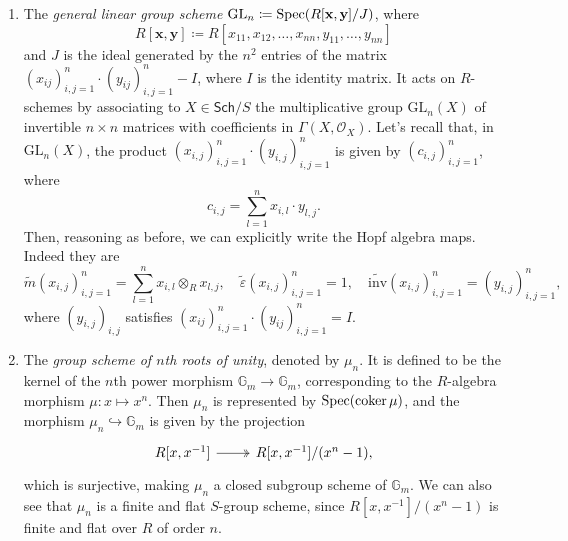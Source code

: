\begin{ex}
\begin{enumerate}
		\item The \emph{general linear group scheme} $\mathrm{GL}_n \coloneqq 
			\operatorname{Spec}(R[\mathbf{x},\mathbf{y}]/J)$,
			where
			\begin{equation*}
				R[\mathbf{x},\mathbf{y}] \coloneqq
				R[x_{11}, x_{12}, \ldots, x_{nn},
				y_{11}, \ldots, y_{nn}]
			\end{equation*} 
			and $J$ is the ideal generated by the $n^2$ entries of the matrix
			$\left( x_{ij} \right)_{i,j=1}^n \cdot \left( y_{ij} \right)_{i,j=1}^n - I$,
			where $I$ is the identity matrix.
			It acts on $R$-schemes by associating to
			$X \in \mathsf{Sch}/S$ the multiplicative group
			$\mathrm{GL}_n(X)$ of invertible $n \times n$
			matrices with coefficients in $\Gamma \left( X , \mathcal{O}_{ X } \right)$.
			Let's recall that, in $\mathrm{GL}_n(X)$, the product
			$\left( x_{i,j} \right)_{i,j = 1}^n \cdot 
			\left( y_{i,j} \right)_{i,j = 1}^n$
			is given by $\left( c_{i,j} \right)_{i,j = 1}^n$, where
			\begin{equation*}
			c_{i,j} = \sum_{l=1}^{n} x_{i,l} \cdot y_{l,j}
			.\end{equation*} 
			Then, reasoning as before, we can explicitly write the Hopf algebra maps.
			Indeed they are
			\begin{equation*}
				\widetilde{m}(x_{i,j})_{i,j=1}^n = \sum_{l=1}^{n} x_{i,l} \otimes_R x_{l,j},
				\quad
				\widetilde{\varepsilon}(x_{i,j})_{i,j=1}^n = 1,
				\quad
				\widetilde{\mathrm{inv}}(x_{i,j})_{i,j=1}^n = (y_{i,j})_{i,j=1}^n
			,\end{equation*} 
			where $\left( y_{i,j} \right)_{i,j}$ satisfies 
			$\left( x_{ij} \right)_{i,j=1}^n \cdot \left( y_{ij} \right)_{i,j=1}^n = I$.


		\item The \emph{group scheme of $n$th roots of unity}, denoted by $\mu_n$.
			It is defined to be the kernel of the $n$th power morphism
			$\mathbb{G}_m \to \mathbb{G}_m$,
			corresponding to the $R$-algebra morphism
			$\mu\colon x \mapsto x^n$.
			Then $\mu_n$ is represented by $\operatorname{Spec}(\operatorname{coker} \mu)$,
			and the morphism $\mu_n \hookrightarrow \mathbb{G}_m$ is given by the projection
			\begin{equation*}
			\begin{tikzcd}
				R[x,x^{-1}] \arrow[r, "", twoheadrightarrow] &
				R[x,x^{-1}] / (x^n - 1)
			,\end{tikzcd}
			\end{equation*}
			which is surjective, making $\mu_n$
			a closed subgroup scheme of $\mathbb{G}_m$.
			We can also see that 
			$\mu_n$ is a finite and flat $S$-group scheme, 
			since $R[x,x^{-1}] / (x^n-1)$ is finite and flat over $R$
			of order \(n\).



\end{enumerate}
\end{ex}
